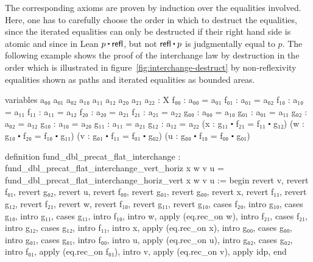 The corresponding axioms are proven by induction over the equalities involved.
Here, one has to carefully choose the order in which to destruct the equalities,
since the iterated equalities can only be destructed if their right hand side
is atomic and since in Lean $p \ct \refl$, but not $\refl \ct p$ is judgmentally
equal to $p$.
The following example shows the proof of the interchange law by destruction in the
order which is illustrated in
figure~\ref{fig:interchange-destruct} by
non-reflexivity equalities shown as paths and iterated equalities as bounded
areas.
\begin{leancodebr}
  variables
    {a₀₀ a₀₁ a₀₂ a₁₀ a₁₁ a₁₂ a₂₀ a₂₁ a₂₂ : X}
    {f₀₀ : a₀₀ = a₀₁} {f₀₁ : a₀₁ = a₀₂} {f₁₀ : a₁₀ = a₁₁} {f₁₁ : a₁₁ = a₁₂}
    {f₂₀ : a₂₀ = a₂₁} {f₂₁ : a₂₁ = a₂₂} {g₀₀ : a₀₀ = a₁₀} {g₀₁ : a₀₁ = a₁₁}
    {g₀₂ : a₀₂ = a₁₂} {g₁₀ : a₁₀ = a₂₀} {g₁₁ : a₁₁ = a₂₁} {g₁₂ : a₁₂ = a₂₂}
    (x : g₁₁ ⬝ f₂₁ = f₁₁ ⬝ g₁₂) (w : g₁₀ ⬝ f₂₀ = f₁₀ ⬝ g₁₁)
    (v : g₀₁ ⬝ f₁₁ = f₀₁ ⬝ g₀₂) (u : g₀₀ ⬝ f₁₀ = f₀₀ ⬝ g₀₁)

  definition fund_dbl_precat_flat_interchange :
    fund_dbl_precat_flat_interchange_vert_horiz x w v u
    = fund_dbl_precat_flat_interchange_horiz_vert x w v u :=
  begin
    revert v, revert f₀₁, revert g₀₂,
    revert u, revert f₀₀, revert g₀₁, revert g₀₀,
    revert x, revert f₁₁, revert g₁₂, revert f₂₁,
    revert w, revert f₁₀, revert g₁₁, revert g₁₀,
    cases f₂₀,
    intro g₁₀, cases g₁₀,
    intro g₁₁, cases g₁₁,
    intro f₁₀, intro w, apply (eq.rec_on w),
    intro f₂₁, cases f₂₁,
    intro g₁₂, cases g₁₂,
    intro f₁₁, intro x, apply (eq.rec_on x),
    intro g₀₀, cases g₀₀,
    intro g₀₁, cases g₀₁,
    intro f₀₀, intro u, apply (eq.rec_on u),
    intro g₀₂, cases g₀₂,
    intro f₀₁, apply (eq.rec_on f₀₁),
    intro v,   apply (eq.rec_on v),
    apply idp,
  end
\end{leancodebr}

